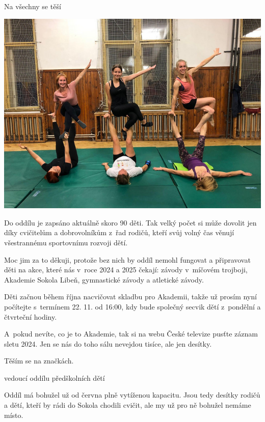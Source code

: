 \documentclass[11pt]{article}
\begin{document}
Na všechny se těší

\signature{Anička a Markéta}{}

\vspace*{12pt}
\begin{center}
  \includegraphics[width=0.8\linewidth]{./akrojoga-2.jpg}
\end{center}

\vspace*{24pt}

Do oddílu je zapsáno aktuálně skoro 90 děti. Tak velký počet si může dovolit jen díky cvičitelům a dobrovolníkům z~řad rodičů, kteří svůj volný čas věnují všestrannému sportovnímu rozvoji dětí.

Moc jim za to děkuji, protože bez nich by oddíl nemohl fungovat a připravovat děti na akce, které nás v~roce 2024 a 2025 čekají: závody v~míčovém trojboji, Akademie Sokola Libeň, gymnastické závody a atletické závody.

Děti začnou během října nacvičovat skladbu pro Akademii, takže už prosím nyní počítejte s~termínem 22. 11. od 16:00, kdy bude společný secvik dětí z~pondělní a čtvrteční hodiny.

A~pokud nevíte, co je to Akademie, tak si na webu České televize pusťte záznam sletu 2024. Jen se nás do toho sálu nevejdou tisíce, ale jen desítky.

Těším se na značkách.

\signature{Dana Cejpková}{vedoucí oddílu předškolních dětí}

\vspace*{24pt}

Oddíl má bohužel už od června plně vytíženou kapacitu. Jsou tedy desítky rodičů a dětí, kteří by rádi do Sokola chodili cvičit, ale my už pro ně bohužel nemáme místo.
\end{document}
